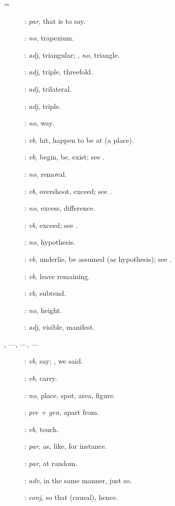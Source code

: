 {\begin{description}
\item[ = ] : {\em par}, that is to say.
\item[]: {\em no}, trapezium.
\item[]: {\em adj}, triangular; , {\em no},
triangle.
\item[]: {\em adj}, triple, threefold.
\item[]: {\em adj}, trilateral.
\item[]: {\em adj}, triple.
\item[]: {\em no}, way.
\item[] \- :
{\em vb}, hit, happen to be at (a place).
\item[]: {\em vb}, begin, be, exist; see .
\item[]: {\em no}, removal.
\item[]: {\em vb}, overshoot, exceed; see .
\item[]: {\em no}, excess, difference.
\item[]: {\em vb}, exceed; see .
\item[]: {\em no}, hypothesis.
\item[]: {\em vb},  underlie, be assumed (as hypothesis); see .
\item[]: {\em vb}, leave remaining.
\item[]: {\em vb}, subtend.
\item[]: {\em no}, height.
\item[]: {\em adj}, visible, manifest.
\item[, ---, ---, ---]: {\em vb}, say; , we said.
\item[]:
{\em vb}, carry.
\item[]: {\em no}, place, spot, area, figure.
\item[]: {\em pre + gen}, apart from.
\item[]: {\em vb}, touch.
\item[]: {\em par}, as, like, for instance.
\item[]: {\em par}, at random.
\item[]: {\em adv}, in the same manner, just so.
\item[]: {\em conj}, so that (causal), hence.
\end{description}}
 
